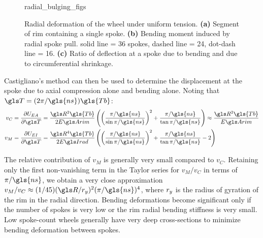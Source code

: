 \documentclass[\rootdir/thesis.tex]{subfiles}
\begin{document}
\begin{figure}
\centering
{radial_bulging_figs}
\caption[Radial deformation of the wheel under uniform tension]{Radial deformation of the wheel under uniform tension. \textbf{(a)} Segment of rim containing a single spoke. \textbf{(b)} Bending moment induced by radial spoke pull. solid line = 36 spokes, dashed line = 24, dot-dash line = 16. \textbf{(c)} Ratio of deflection at a spoke due to bending and due to circumferential shrinkage.}
\label{fig:radial_bulging}
\end{figure}

Castigliano's method can then be used to determine the displacement at the spoke due to axial compression alone and bending alone. Noting that $\T = (2\pi/\gls{ns})\gls{Tb}$:
\begin{align}
v_C &= \frac{\partial U_{EA}}{\partial \T} = \frac{\R^2\gls{Tb}}{2\EA} \left( \left(\frac{\pi/\gls{ns}}{\sin{\pi/\gls{ns}}}\right)^2 +
    \frac{\pi/\gls{ns}}{\tan{\pi/\gls{ns}}}\right)
    \approx \frac{\R^2\gls{Tb}}{\EA}\label{eq:vC}\\
v_M &= \frac{\partial U_{EI}}{\partial \T} = \frac{\R^4\gls{Tb}}{2\EIr} \left( \left(\frac{\pi/\gls{ns}}{\sin{\pi/\gls{ns}}}\right)^2 +
    \frac{\pi/\gls{ns}}{\tan{\pi/\gls{ns}}} - 2\right)\label{eq:vM}
\end{align}

The relative contribution of $v_M$ is generally very small compared to $v_C$. Retaining only the first non-vanishing term in the Taylor series for $v_M/v_C$ in terms of $\pi/\gls{ns}$, we obtain a very close approximation $v_M/v_C\approx(1/45)(\R/\ry)^2(\pi/\gls{ns})^4$, where $r_y$ is the radius of gyration of the rim in the radial direction. Bending deformations become significant only if the number of spokes is very low or the rim radial bending stiffness is very small. Low spoke-count wheels generally have very deep cross-sections to minimize bending deformation between spokes.
\end{document}
